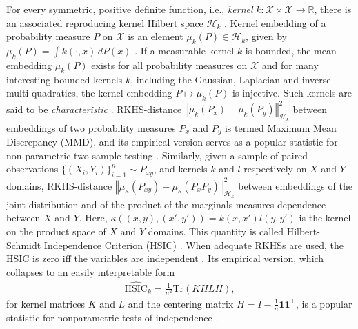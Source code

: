 \documentclass{article} %
\begin{document}
For every symmetric, positive definite function, i.e., \emph{kernel} $k:\mathcal{X}\times\mathcal{X}\to\mathbb{R}$,
there is an associated reproducing kernel Hilbert space $\mathcal{H}_{k}$ \cite[p. 19]{BerTho04}.  Kernel embedding of a probability measure
$P$ on $\mathcal{X}$ is an element $\mu_{k}(P)\in\mathcal{H}_{k}$,
given by $\mu_{k}(P)=\int k(\cdot,x)\, dP(x)$ \cite{BerTho04,SmoGreSonSch07}.
If a measurable kernel $k$ is bounded, the mean embedding $\mu_{k}(P)$
exists for all probability measures on $\mathcal{X}$ and for many interesting
bounded kernels $k$, including the Gaussian, Laplacian and inverse
multi-quadratics, the kernel embedding $P\mapsto\mu_{k}(P)$ is injective.
Such kernels are said to be \emph{characteristic} \cite{SriGreFukLanetal10}.
RKHS-distance $\left\Vert \mu_k(P_x)-\mu_k(P_y)\right\Vert_{{\mathcal H}_k}^2$ between embeddings of two probability measures $P_x$ and $P_y$
is termed Maximum Mean Discrepancy (MMD), and its empirical version serves as a popular statistic for non-parametric two-sample testing \cite{gretton_kernel_2012}.
Similarly, given a sample of paired observations $\{(X_i,Y_i)\}_{i=1}^n\sim P_{xy}$, and kernels $k$ and $l$ respectively on $X$ and $Y$ domains, RKHS-distance 
$\left\Vert \mu_\kappa(P_{xy})-\mu_\kappa(P_x P_y)\right\Vert_{{\mathcal H}_{\kappa}}^2$ between embeddings of the joint distribution and of the product of the marginals measures dependence between $X$ and $Y$. Here, $\kappa((x,y),(x',y'))=k(x,x')l(y,y')$ is the kernel on the product space of $X$ and $Y$ domains.
This quantity is called Hilbert-Schmidt Independence Criterion (HSIC) \cite{gretton_measuring_2005,gretton_kernel_2008}. When adequate RKHSs are used, the HSIC is zero iff the variables are independent \cite{SriGreFukLanetal10}. 
Its empirical version, which collapses to an easily interpretable form
\begin{align}
 \widehat{\text{HSIC}}_k = \frac{1}{n^2}\text{Tr}(KHLH),\label{eq:empHSIC}
\end{align}
for kernel matrices $K$ and $L$ and the centering matrix $H=I-\frac{1}{n}\mathbf{1}\mathbf{1}^\top$, is a popular statistic for nonparametric tests of independence \cite{gretton_kernel_2008}.
\end{document}
